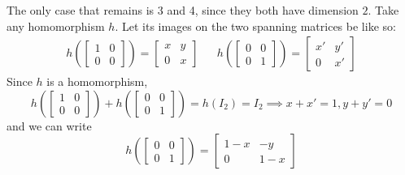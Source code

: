 \documentclass[12pt]{article}
\begin{document}
The only case that remains is 3 and 4, since they both have dimension $2$.
Take any homomorphism $h$.
Let its images on the two spanning matrices be like so:
\begin{align*}
  h\left(\begin{bmatrix}1 & 0 \\ 0 & 0\end{bmatrix}\right)=\begin{bmatrix}x & y \\0 & x\end{bmatrix}
   &  & h\left(\begin{bmatrix}0 & 0 \\ 0 & 1\end{bmatrix}\right)=\begin{bmatrix}x' & y' \\0 & x'\end{bmatrix}
\end{align*}
Since $h$ is a homomorphism,
\[h\left(\begin{bmatrix}1 & 0 \\ 0 & 0\end{bmatrix}\right)
  +h\left(\begin{bmatrix}0 & 0 \\ 0 & 1\end{bmatrix}\right)
  =h(I_2)=I_2 \implies
  x+x'=1,y+y'=0\]
and we can write
\[h\left(\begin{bmatrix}0 & 0 \\ 0 & 1\end{bmatrix}\right)=\begin{bmatrix}1-x & -y \\0 & 1-x\end{bmatrix}\]
\end{document}
